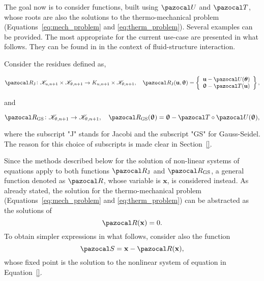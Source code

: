 The goal now is to consider functions, built using \(\pazocal U\) and \(\pazocal T\), whose roots are also the solutions to the thermo-mechanical problem (Equations~\eqref{eq:mech_problem} and \eqref{eq:therm_problem}).
Several examples can be provided.
The most appropriate for the current use-case are presented in what follows.
They can be found in \cite{uekermann_partitioned_2016} in the context of fluid-structure interaction.

Consider the residues defined as,
\begin{highlight}
\begin{equation} \label{eq:def_res_jacobi}
  \pazocal R_\text{J}\colon \mathscr K_{u,n+1}\times\mathscr K_{\theta,n+1} \to K_{u,n+1}\times\mathscr K_{\theta,n+1},\quad  \pazocal R_\text{J}(\mathbf u, \bm \uptheta) =
  \left\{\begin{array}{c}
  \mathbf u - \pazocal U(\bm \theta)\\
  \bm \uptheta - \pazocal T(\mathbf u)
  \end{array}\right\},
\end{equation}
\end{highlight}
and
\begin{highlight}
\begin{equation} \label{eq:def_res_gauss_seidel}
  \pazocal R_\text{GS}\colon \mathscr K_{\theta,n+1} \to\mathscr K_{\theta,n+1},\quad \pazocal R_\text{GS}(\bm \uptheta) =
  \bm \uptheta - \pazocal T\circ \pazocal U(\bm \uptheta),
\end{equation}
\end{highlight}
where the subscript "J" stands for Jacobi and the subscript "GS" for Gauss-Seidel.
The reason for this choice of subscripts is made clear in Section~\ref{}.


Since the methods described below for the solution of non-linear systems of equations apply to both functions \(\pazocal R_\mathrm{J}\) and \(\pazocal R_\mathrm{GS}\), a general function denoted as \(\pazocal R\), whose variable is \(\mathbf x\), is considered instead.
As already stated, the solution for the thermo-mechanical problem (Equations~\eqref{eq:mech_problem} and \eqref{eq:therm_problem}) can be abstracted as the solutions of
\begin{equation} \label{eq:abstract_residue_equation}
  \pazocal R(\mathbf x) = 0.
\end{equation}
To obtain simpler expressions in what follows, consider also the function
\begin{equation}
\pazocal S = \mathbf x - \pazocal R(\mathbf x),
\end{equation}
whose fixed point is the solution to the nonlinear system of equation in Equation~\eqref{}.

